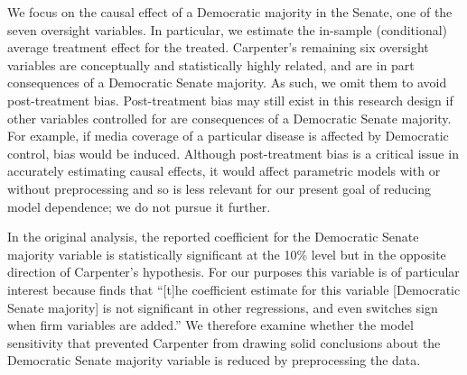 \documentclass[11pt,titlepage]{article}
\begin{document}
We focus on the causal effect of a Democratic majority in the Senate,
one of the seven oversight variables. In particular, we estimate the
in-sample (conditional) average treatment effect for the treated.
Carpenter's remaining six oversight variables are conceptually and
statistically highly related, and are in part consequences of a
Democratic Senate majority.  As such, we omit them to avoid
post-treatment bias.  Post-treatment bias may still exist in this
research design if other variables controlled for are consequences of
a Democratic Senate majority.  For example, if media coverage of a
particular disease is affected by Democratic control, bias would be
induced.  Although post-treatment bias is a critical issue in
accurately estimating causal effects, it would affect parametric
models with or without preprocessing and so is less relevant for our
present goal of reducing model dependence; we do not pursue it
further.


In the original analysis, the reported coefficient for the Democratic
Senate majority variable is statistically significant at the 10\%
level but in the opposite direction of Carpenter's hypothesis.  For
our purposes this variable is of particular interest because
\citet[p.498]{Carpenter02} finds that ``[t]he coefficient estimate for
this variable [Democratic Senate majority] is not significant in other
regressions, and even switches sign when firm variables are added.''
We therefore examine whether the model sensitivity that prevented
Carpenter from drawing solid conclusions about the Democratic Senate
majority variable is reduced by preprocessing the data.
\end{document}
